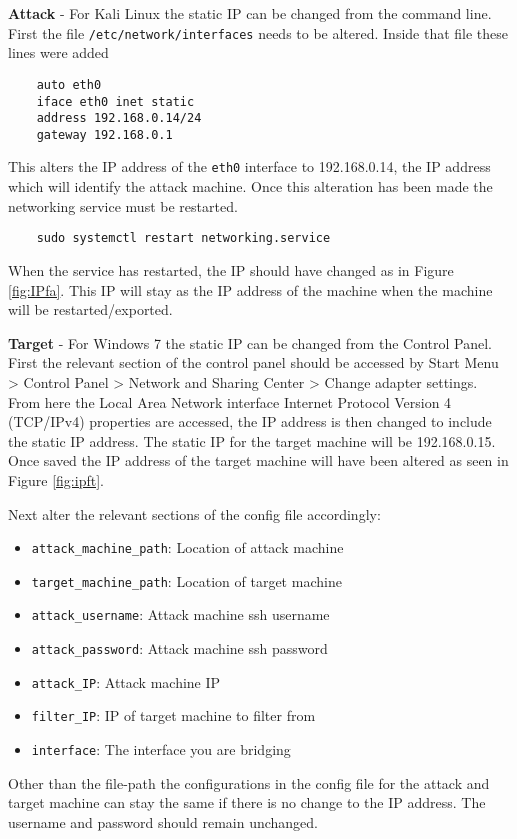 \textbf{Attack} - For Kali Linux the static IP can be changed from the command line. First the file  \texttt{/etc/network/interfaces} needs to be altered. Inside that file these lines were added
\begin{verbatim}
    auto eth0
    iface eth0 inet static
    address 192.168.0.14/24
    gateway 192.168.0.1
\end{verbatim}
This alters the IP address of the \texttt{eth0} interface to 192.168.0.14, the IP address which will identify the attack machine. Once this alteration has been made the networking service must be restarted.
\begin{verbatim}
    sudo systemctl restart networking.service
\end{verbatim}

When the service has restarted, the IP should have changed as in Figure \ref{fig:IPfa}. This IP will stay as the IP address of the machine when the machine will be restarted/exported.

\textbf{Target} - For Windows 7 the static IP can be changed from the Control Panel. First the relevant section of the control panel should be accessed by Start Menu > Control Panel > Network and Sharing Center > Change adapter settings. From here the Local Area Network interface  Internet Protocol Version 4 (TCP/IPv4) properties are accessed, the IP address is then changed to include the static IP address. The static IP for the target machine will be 192.168.0.15. Once saved the IP address of the target machine will have been altered as seen in Figure \ref{fig:ipft}.

Next alter the relevant sections of the config file accordingly:
\begin{itemize}
    \item \texttt{attack\_machine\_path}: Location of attack machine
    \item \texttt{target\_machine\_path}: Location of target machine
    \item \texttt{attack\_username}: Attack machine ssh username
    \item \texttt{attack\_password}: Attack machine ssh password
    \item \texttt{attack\_IP}: Attack machine IP
    \item \texttt{filter\_IP}: IP of target machine to filter from
    \item  \texttt{interface}: The interface you are bridging
\end{itemize}

Other than the file-path the configurations in the config file for the attack and target machine can stay the same if there is no change to the IP address. The username and password should remain unchanged.

